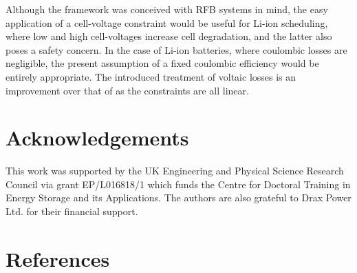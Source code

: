 \documentclass[preprint,3p,review,authoryear,10pt]{elsarticle}
\begin{document}
Although the framework was conceived with RFB systems in mind, the easy application of a cell-voltage constraint would be useful for Li-ion scheduling, where low and high cell-voltages increase cell degradation, and the latter also poses a safety concern. In the case of Li-ion batteries, where coulombic losses are negligible, the present assumption of a fixed coulombic efficiency would be entirely appropriate. The introduced treatment of voltaic losses is an improvement over that of \cite{Sarker2017} as the constraints are all linear.

\section{Acknowledgements}

This work was supported by the UK Engineering and Physical Science Research Council via grant EP/L016818/1 which funds the Centre for Doctoral Training in Energy Storage and its Applications. The authors are also grateful to Drax Power Ltd. for their financial support.


\section*{References}


\end{document}
